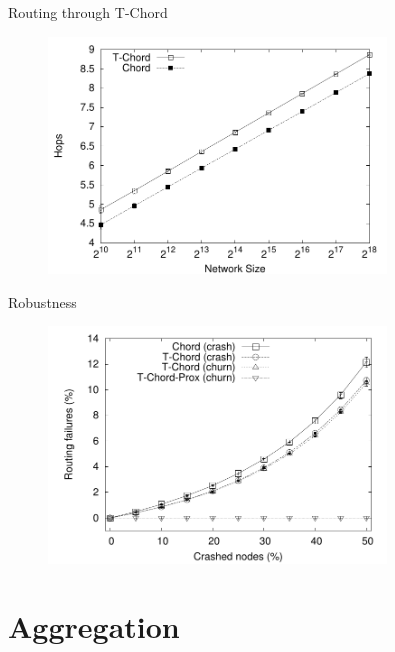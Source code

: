 \begin{frame}{Routing through T-Chord}

\begin{figure}
	\includegraphics[width=0.80\textwidth]{chord-routing}
\end{figure}	


\end{frame}

\begin{frame}{Robustness}

\begin{figure}
	\includegraphics[width=0.80\textwidth]{chord-crash-fail}
\end{figure}	


\end{frame}

\section{Aggregation}

